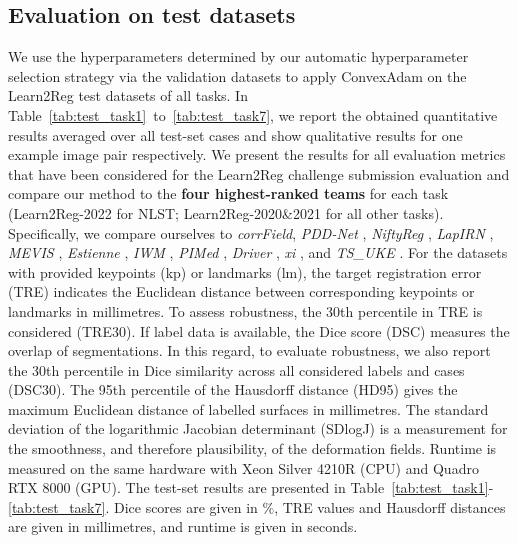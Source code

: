 \subsection{Evaluation on test datasets}

We use the hyperparameters determined by our automatic hyperparameter selection strategy via the validation datasets to apply ConvexAdam on the Learn2Reg test datasets of all tasks. In Table~\ref{tab:test_task1}~to~\ref{tab:test_task7}, we report the obtained quantitative results averaged over all test-set cases and show qualitative results for one example image pair respectively. We present the results for all evaluation metrics that have been considered for the Learn2Reg challenge submission evaluation and compare our method to the \textbf{four highest-ranked teams} for each task (Learn2Reg-2022 for NLST; Learn2Reg-2020\&2021 for all other tasks). Specifically, we compare ourselves to \textit{corrField}\citep{hansen2021graphregnet,heinrich2015estimating}, \textit{PDD-Net} \citep{heinrich2019closing,heinrich2020highly}, \textit{NiftyReg} \citep{modat2014global},  \textit{LapIRN} \citep{mok2020large,mok2021conditional}, \textit{MEVIS} \citep{hager2020variable,hering2021fraunhofer}, \textit{Estienne} \citep{estienne2020adeep,estienne2020bdeep}, \textit{IWM} \citep{hering2022learn2reg}, \textit{PIMed} \citep{hering2022learn2reg}, \textit{Driver} \citep{lv2022joint}, \textit{xi} \citep{jia2022u}, and \textit{TS\_UKE} \citep{ehrhardt2015variational,werner2014estimation}. For the datasets with provided keypoints (kp) or landmarks (lm), the target registration error (TRE) indicates the Euclidean distance between corresponding keypoints or landmarks in millimetres. To assess robustness, the 30th percentile in TRE is considered (TRE30). If label data is available, the Dice score (DSC) measures the overlap of segmentations. In this regard, to evaluate robustness, we also report the 30th percentile in Dice similarity across all considered labels and cases (DSC30). The 95th percentile of the Hausdorff distance (HD95) gives the maximum Euclidean distance of labelled surfaces in millimetres. The standard deviation of the logarithmic Jacobian determinant (SDlogJ) is a measurement for the smoothness, and therefore plausibility, of the deformation fields. Runtime is measured on the same hardware with Xeon Silver 4210R (CPU) and Quadro RTX 8000 (GPU). The test-set results are presented in Table~\ref{tab:test_task1}-\ref{tab:test_task7}. Dice scores are given in $\%$, TRE values and Hausdorff distances are given in millimetres, and runtime is given in seconds.

